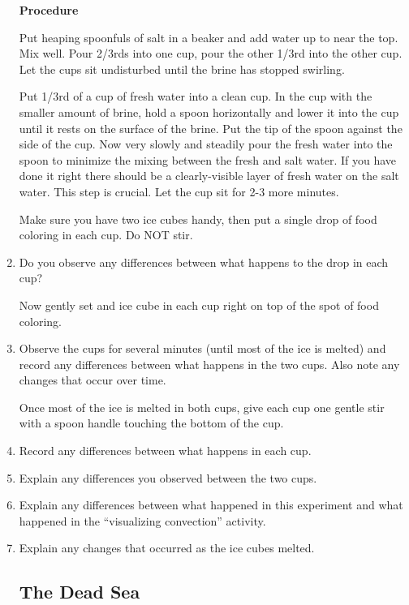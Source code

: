 \documentclass[12pt]{article}
\begin{document}
\begin{enumerate}
\vspace{.1in}
\textbf{Procedure}


Put  heaping spoonfuls of salt in a beaker and add water up to near the top.  Mix well.  Pour 2/3rds into one cup, pour the other 1/3rd into the other cup.  Let the cups sit undisturbed until the brine has stopped swirling.

Put 1/3rd of a cup of fresh water into a clean cup.  In the cup with the smaller amount of brine, hold a spoon horizontally and lower it into the cup until it rests on the surface of the brine.  Put the tip of the spoon against the side of the cup.  Now very slowly and steadily pour the fresh water into the spoon to minimize the mixing between the fresh and salt water.  If you have done it right there should be a clearly-visible layer of fresh water on the salt water.  This step is crucial.  Let the cup sit for 2-3 more minutes.

Make sure you have two ice cubes handy, then put a single drop of food coloring in each cup.  Do NOT stir. 
\item Do you observe any differences between what happens to the drop in each cup?

\vspace{.1in}

Now gently set and ice cube in each cup right on top of the spot of food coloring.  
\item Observe the cups for several minutes (until most of the ice is melted) and record any differences between what happens in the two cups.  Also note any changes that occur over time.

Once most of the ice is melted in both cups, give each cup one gentle stir with a spoon handle touching the bottom of the cup.

\item Record any differences between what happens in each cup.

\item Explain any differences you observed between the two cups.
\item Explain any differences between what happened in this experiment and what happened in the ``visualizing convection'' activity.
\item Explain any changes that occurred as the ice cubes melted.


\subsection{The Dead Sea}



\end{enumerate}
\end{document}
